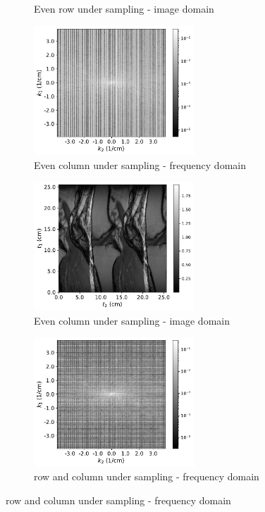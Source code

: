 \documentclass[12pt,twoside]{article}
\begin{document}
\begin{enumerate}
\begin{enumerate}
\begin{figure}[H]
\begin{subfigure}[]{.5\textwidth}
        \caption{Even row under sampling - image domain}
    \end{subfigure} 
    \hspace{4pt}%
   \begin{subfigure}[]{.5\textwidth}
   \centering
        \includegraphics[width=60mm]{code/mr_undersampling/mri_undersampling_even_columns_fft.pdf}
	\caption{Even column under sampling - frequency domain}
    \end{subfigure}%
   \begin{subfigure}[]{.5\textwidth}
   \centering   
        \includegraphics[width=60mm]{code/mr_undersampling/mri_even_columns_recons.pdf}
        \caption{Even column under sampling - image domain}
        \label{fig:b}    
    \end{subfigure} 
   \begin{subfigure}[]{.5\textwidth}
   \centering
        \includegraphics[width=60mm]{code/mr_undersampling/mri_undersampling_even_rows_columns_fft.pdf}
	\caption{row and column under sampling - frequency domain}
    \end{subfigure}%

\end{figure}
\end{enumerate}
\end{enumerate}
\end{document}
